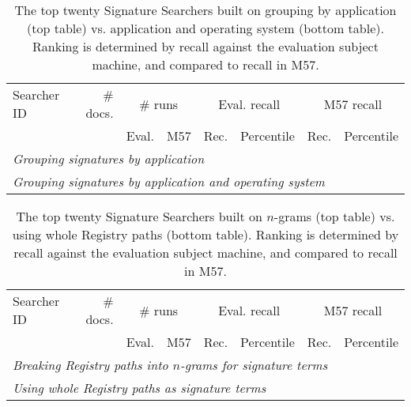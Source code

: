 \documentclass[11pt]{ucthesis}
\theoremstyle{plain}
\theoremstyle{definition}
\begin{document}
\begin{table}[htp]
\caption{\label{tbl:top10:docsby:recall}The top twenty Signature Searchers built on grouping by application (top table) vs. application and operating system (bottom table).  Ranking is determined by recall against the evaluation subject machine, and compared to recall in M57.}
\centering
\begin{small}
\begin{tabular}{lr|rr|rr|rr}
\toprule
Searcher ID & \# docs. & \multicolumn{2}{c|}{\# runs} & \multicolumn{2}{c|}{Eval. recall} & \multicolumn{2}{c}{M57 recall} \\
 & & Eval. & M57 & Rec. & Percentile & Rec. & Percentile \\
\midrule
\multicolumn{8}{l}{\emph{Grouping signatures by application}} \\

\midrule
\multicolumn{8}{l}{\emph{Grouping signatures by application and operating system}} \\

\bottomrule
\end{tabular}
\end{small}
\end{table}

\begin{table}[htp]
\caption{\label{tbl:top10:ngc:recall}The top twenty Signature Searchers built on $n$-grams (top table) vs. using whole Registry paths (bottom table).  Ranking is determined by recall against the evaluation subject machine, and compared to recall in M57.}
\centering
\begin{small}
\begin{tabular}{lr|rr|rr|rr}
\toprule
Searcher ID & \# docs. & \multicolumn{2}{c|}{\# runs} & \multicolumn{2}{c|}{Eval. recall} & \multicolumn{2}{c}{M57 recall} \\
 & & Eval. & M57 & Rec. & Percentile & Rec. & Percentile \\
\midrule
\multicolumn{8}{l}{\emph{Breaking Registry paths into $n$-grams for signature terms}} \\

\midrule
\multicolumn{8}{l}{\emph{Using whole Registry paths as signature terms}} \\

\bottomrule
\end{tabular}
\end{small}
\end{table}
\end{document}

